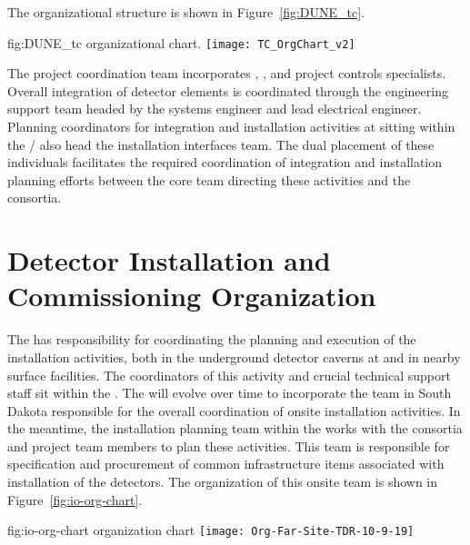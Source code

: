 The   organizational structure is shown 
in Figure~\ref{fig:DUNE_tc}.  

\begin{dunefigure}{fig:DUNE_tc}
  {  organizational chart.}
  \texttt{[image: TC\_OrgChart\_v2]}
\end{dunefigure}

The  project coordination team incorporates , 
, and project controls specialists.  Overall integration 
of  detector elements is coordinated through the  
engineering support team headed by the  systems 
engineer and lead  electrical engineer.  Planning 
coordinators for integration and installation activities at 
 sitting within the /  also head the  installation interfaces team.  
The dual placement of these individuals facilitates the required 
coordination of integration and installation planning efforts between 
the core team directing these activities and the  
consortia. 


\section{Detector Installation and Commissioning Organization}
\label{sec:es-tc-det-instal}

The  has
responsibility for coordinating the planning and execution of 
the  installation activities, both 
in the underground detector caverns at  and in 
nearby surface facilities. The coordinators of this activity and crucial technical support
staff sit within the .
The   will evolve over 
time to incorporate the team in South Dakota responsible for the 
overall coordination of onsite installation activities.  In the 
meantime, the installation planning team within the  works with 
the  consortia and  project team members 
to plan these activities.  This team is responsible for specification 
and procurement of common infrastructure items associated with 
installation of the detectors. The organization of this onsite team is 
shown in Figure~\ref{fig:io-org-chart}.

\begin{dunefigure}{fig:io-org-chart}
  {  organization chart}
  \texttt{[image: Org-Far-Site-TDR-10-9-19]}
\end{dunefigure}

